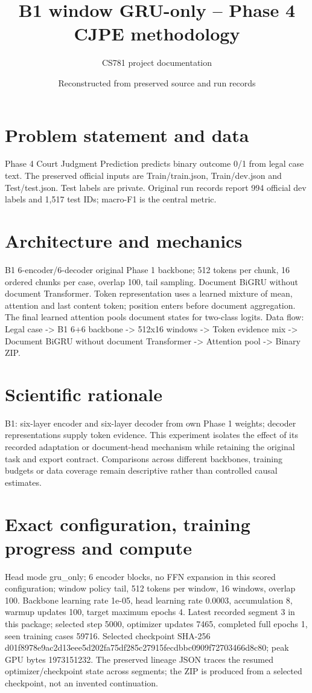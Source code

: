 \documentclass[11pt,a4paper]{article}
\begin{document}
\title{B1 window GRU-only -- Phase 4 CJPE methodology}
\author{CS781 project documentation}
\date{Reconstructed from preserved source and run records}
\maketitle
\section{Problem statement and data}
Phase 4 Court Judgment Prediction predicts binary outcome 0/1 from legal case text. The preserved official inputs are Train/train.json, Train/dev.json and Test/test.json. Test labels are private. Original run records report 994 official dev labels and 1,517 test IDs; macro-F1 is the central metric.
\section{Architecture and mechanics}
B1 6-encoder/6-decoder original Phase 1 backbone; 512 tokens per chunk, 16 ordered chunks per case, overlap 100, tail sampling. Document BiGRU without document Transformer. Token representation uses a learned mixture of mean, attention and last content token; position enters before document aggregation. The final learned attention pools document states for two-class logits. Data flow: Legal case -> B1 6+6 backbone -> 512x16 windows -> Token evidence mix -> Document BiGRU without document Transformer -> Attention pool -> Binary ZIP.
\section{Scientific rationale}
B1: six-layer encoder and six-layer decoder from own Phase 1 weights; decoder representations supply token evidence. This experiment isolates the effect of its recorded adaptation or document-head mechanism while retaining the original task and export contract. Comparisons across different backbones, training budgets or data coverage remain descriptive rather than controlled causal estimates.
\section{Exact configuration, training progress and compute}
Head mode gru\_only; 6 encoder blocks, no FFN expansion in this scored configuration; window policy tail, 512 tokens per window, 16 windows, overlap 100. Backbone learning rate 1e-05, head learning rate 0.0003, accumulation 8, warmup updates 100, target maximum epochs 4. Latest recorded segment 3 in this package; selected step 5000, optimizer updates 7465, completed full epochs 1, seen training cases 59716. Selected checkpoint SHA-256 d01f8978e9ac2d13eee5d202fa75df285c27915fecdbbc0909f72703466d8c80; peak GPU bytes 1973151232. The preserved lineage JSON traces the resumed optimizer/checkpoint state across segments; the ZIP is produced from a selected checkpoint, not an invented continuation.
\end{document}
